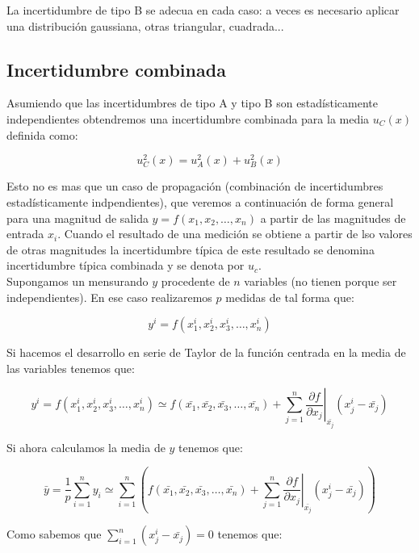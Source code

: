 \documentclass[12pt,a4paper]{book}
\newcommand{\parciales}[2]{\frac{\partial #1}{\partial #2}}
\begin{document}
La incertidumbre de tipo B se adecua en cada caso: a veces es necesario aplicar una distribución gaussiana, otras triangular, cuadrada... 

\subsection{Incertidumbre combinada}

Asumiendo que las incertidumbres de tipo A y tipo B son estadísticamente independientes obtendremos una incertidumbre combinada para la media $u_C(x)$ definida como:

\begin{equation}
u_C^2(x) = u_A^2(x) + u_B^2(x)
\end{equation}

Esto no es mas que un caso de propagación (combinación de incertidumbres estadísticamente indpendientes), que veremos a continuación de forma general para una magnitud de salida $y=f(x_1,x_2,\ldots,x_n)$ a partir de las magnitudes de entrada $x_i$. Cuando el resultado de una medición se obtiene a partir de lso valores de otras magnitudes la incertidumbre típica de este resultado se denomina incertidumbre típica combinada y se denota por $u_c$. \\

Supongamos un mensurando $y$ procedente de $n$ variables (no tienen porque ser independientes). En ese caso realizaremos $p$ medidas de tal forma que:

$$  y^i = f (x_1^i, x_2^i, x_3^i, \ldots, x_n^i) $$

Si hacemos el desarrollo en serie de Taylor de la función centrada en la media de las variables tenemos que:

\begin{equation}
y^i = f (x_1^i, x_2^i, x_3^i, \ldots, x_n^i)  \simeq f(\bar{x_1}, \bar{x_2}, \bar{x_3}, \ldots, \bar{x_n}) + \sum_{j=1}^n \left. \parciales{f}{x_j} \right|_{\bar{x_j}} (x^i_j - \bar{x_j})
\end{equation}

Si ahora calculamos la media de $y$ tenemos que:

\begin{equation}
\bar{y} = \dfrac{1}{p} \sum_{i=1}^n y_i \simeq   \sum_{i=1}^n \left( f(\bar{x_1}, \bar{x_2}, \bar{x_3}, \ldots, \bar{x_n}) + \sum_{j=1}^n \left. \parciales{f}{x_j} \right|_{\bar{x_j}} (x^i_j - \bar{x_j}) \right)
\end{equation}

Como sabemos que $\sum_{i=1}^n (x_j^i - \bar{x_j}) = 0$ tenemos que:
\end{document}
